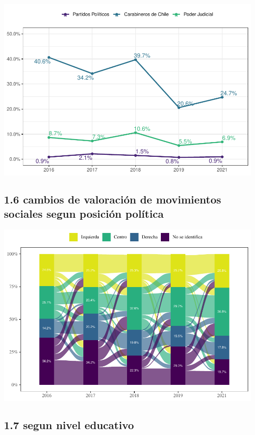 \documentclass[
  12pt,
  openany]{book}
\begin{document}
\includegraphics{reporte-elsoc_files/figure-latex/unnamed-chunk-15-1.pdf}

\hypertarget{cambios-de-valoraciuxf3n-de-movimientos-sociales-segun-posiciuxf3n-poluxedtica}{%
\subsection{1.6 cambios de valoración de movimientos sociales segun posición política}\label{cambios-de-valoraciuxf3n-de-movimientos-sociales-segun-posiciuxf3n-poluxedtica}}

\includegraphics{reporte-elsoc_files/figure-latex/unnamed-chunk-17-1.pdf}

\hypertarget{segun-nivel-educativo}{%
\subsection{1.7 segun nivel educativo}\label{segun-nivel-educativo}}
\end{document}
